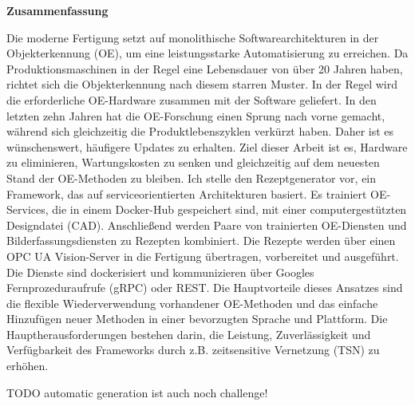 \thispagestyle{empty}
\vspace*{1.0cm}

\begin{center}
    \textbf{Zusammenfassung}
\end{center}

\vspace*{0.5cm}

\noindent

Die moderne Fertigung setzt auf monolithische Softwarearchitekturen in der  Objekterkennung (OE), um eine leistungsstarke Automatisierung zu erreichen. Da Produktionsmaschinen in der Regel eine Lebensdauer von über 20 Jahren haben, richtet sich die Objekterkennung nach diesem starren Muster. In der Regel wird die erforderliche OE-Hardware zusammen mit der Software geliefert. In den letzten zehn Jahren hat die OE-Forschung einen Sprung nach vorne gemacht, während sich gleichzeitig die Produktlebenszyklen verkürzt haben. Daher ist es wünschenswert, häufigere Updates zu erhalten. Ziel dieser Arbeit ist es, Hardware zu eliminieren, Wartungskosten zu senken und gleichzeitig auf dem neuesten Stand der OE-Methoden zu bleiben. Ich stelle den Rezeptgenerator vor, ein Framework, das auf serviceorientierten Architekturen basiert. Es trainiert OE-Services, die in einem Docker-Hub gespeichert sind, mit einer computergestützten Designdatei (CAD). Anschließend werden Paare von trainierten OE-Diensten und Bilderfassungsdiensten zu Rezepten kombiniert. Die Rezepte werden über einen OPC UA Vision-Server in die Fertigung übertragen, vorbereitet und ausgeführt. Die Dienste sind dockerisiert und kommunizieren über Googles Fernprozeduraufrufe (gRPC) oder REST. Die Hauptvorteile dieses Ansatzes sind die flexible Wiederverwendung vorhandener OE-Methoden und das einfache Hinzufügen neuer Methoden in einer bevorzugten Sprache und Plattform. Die Hauptherausforderungen bestehen darin, die Leistung, Zuverlässigkeit und Verfügbarkeit des Frameworks durch z.B. zeitsensitive Vernetzung (TSN) zu erhöhen.

TODO automatic generation ist auch noch challenge!